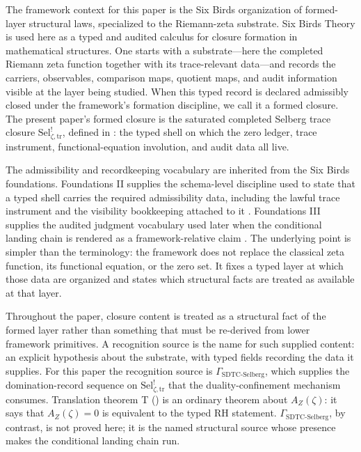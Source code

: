 \documentclass[11pt]{article}
\newcommand{\AZ}{A_{Z}(\zeta)}
\newcommand{\Sel}{\mathrm{Sel}^{!}_{\zeta,\mathrm{tr}}}
\newcommand{\GamSDTCSelberg}{\Gamma_{\mathrm{SDTC\text{-}Selberg}}}
\theoremstyle{definition}
\begin{document}
The framework context for this paper is the Six Birds organization of
formed-layer structural laws, specialized to the Riemann-zeta
substrate.  Six Birds Theory is used here as a typed and audited
calculus for closure formation in mathematical structures.  One
starts with a substrate---here the completed Riemann zeta function
together with its trace-relevant data---and records the carriers,
observables, comparison maps, quotient maps, and audit information
visible at the layer being studied.  When this typed record is
declared admissibly closed under the framework's formation
discipline, we call it a formed closure.  The present paper's formed
closure is the saturated completed Selberg trace closure \(\Sel\),
defined in : the typed shell on which the
zero ledger, trace instrument, functional-equation involution, and
audit data all live.

The admissibility and recordkeeping vocabulary are inherited from the
Six Birds foundations.  Foundations II supplies the schema-level
discipline used to state that a typed shell carries the required
admissibility data, including the lawful trace instrument and the
visibility bookkeeping attached to it \cite{TsiokosFoundationsII2026}.
Foundations III supplies the audited judgment vocabulary used later
when the conditional landing chain is rendered as a framework-relative
claim \cite{TsiokosFoundationsIII2026}.  The underlying point is
simpler than the terminology: the framework does not replace the
classical zeta function, its functional equation, or the zero set.
It fixes a typed layer at which those data are organized and states
which structural facts are treated as available at that layer.

Throughout the paper, closure content is treated as a structural
fact of the formed layer rather than something that must be
re-derived from lower framework primitives.  A recognition source
is the name for such supplied content: an explicit hypothesis about
the substrate, with typed fields recording the data it supplies.
For this paper the recognition source is \(\GamSDTCSelberg\), which
supplies the domination-record sequence on \(\Sel\) that the
duality-confinement mechanism consumes.  Translation theorem T
() is an ordinary theorem about
\(\AZ\): it says that \(\AZ=0\) is equivalent to the typed RH
statement.  \(\GamSDTCSelberg\), by contrast, is not proved here;
it is the named structural source whose presence makes the
conditional landing chain run.
\end{document}
